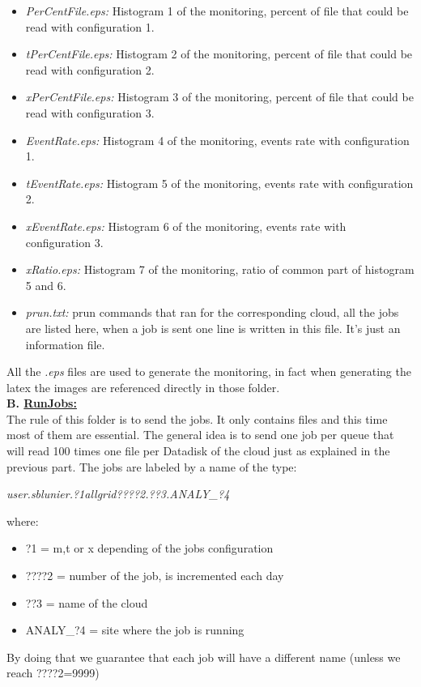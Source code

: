\begin{itemize}
	\item \textit{PerCentFile.eps:} Histogram 1 of the monitoring, percent of file that could be read with configuration 1.
	\item \textit{tPerCentFile.eps:} Histogram 2 of the monitoring, percent of file that could be read with configuration 2.
	\item \textit{xPerCentFile.eps:} Histogram 3 of the monitoring, percent of file that could be read with configuration 3.
	\item \textit{EventRate.eps:} Histogram 4 of the monitoring, events rate with configuration 1.
	\item \textit{tEventRate.eps:} Histogram 5 of the monitoring, events rate with configuration 2.
	\item \textit{xEventRate.eps:} Histogram 6 of the monitoring, events rate with configuration 3.
	\item \textit{xRatio.eps:} Histogram 7 of the monitoring, ratio of common part of histogram 5 and 6.
	\item \textit{prun.txt:} prun commands that ran for the corresponding cloud, all the jobs are listed here, when a job is sent one line is written in this file. It's just an information file.
\end{itemize}

All the \textit{.eps} files are used to generate the monitoring, in fact when generating the latex the images are referenced directly in those folder.\\

\indent \textbf{B. \underline{RunJobs:}}\\

The rule of this folder is to send the jobs. It only contains files and this time most of them are essential. The general idea is to send one job per queue that will read 100 times one file per Datadisk of the cloud just as explained in the previous part. The jobs are labeled by a name of the type:
\begin{center}
	\textit{user.sblunier.?1allgrid????2.??3.ANALY\_?4}\\
\end{center}
where:
\begin{itemize}
	\item ?1 = m,t or x depending of the jobs configuration
	\item ????2 = number of the job, is incremented each day
	\item ??3 = name of the cloud
	\item ANALY\_?4 = site where the job is running
\end{itemize}
By doing that we guarantee that each job will have a different name (unless we reach ????2=9999)\\

